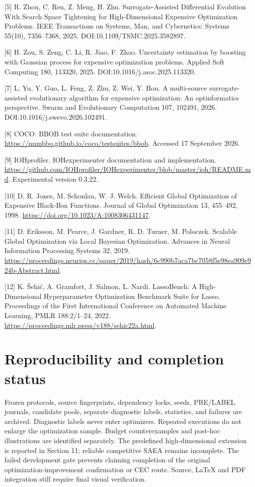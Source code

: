 \documentclass[11pt,a4paper]{article}
\begin{document}
{[}5{]} R. Zhou, C. Ren, Z. Meng, H. Zhu. Surrogate-Assisted
Differential Evolution With Search Space Tightening for High-Dimensional
Expensive Optimization Problems. IEEE Transactions on Systems, Man, and
Cybernetics: Systems 55(10), 7356--7368, 2025.
DOI:10.1109/TSMC.2025.3582897.

{[}6{]} H. Zou, S. Zeng, C. Li, R. Jiao, F. Zhao. Uncertainty estimation
by boosting with Gaussian process for expensive optimization problems.
Applied Soft Computing 180, 113320, 2025.
DOI:10.1016/j.asoc.2025.113320.

{[}7{]} L. Yu, Y. Guo, L. Feng, Z. Zhu, Z. Wei, Y. Hou. A multi-source
surrogate-assisted evolutionary algorithm for expensive optimization: An
optinformatics perspective. Swarm and Evolutionary Computation 107,
102491, 2026. DOI:10.1016/j.swevo.2026.102491.

{[}8{]} COCO. BBOB test suite documentation.
\url{https://numbbo.github.io/coco/testsuites/bbob}. Accessed 17
September 2026.

{[}9{]} IOHprofiler. IOHexperimenter documentation and implementation.
\url{https://github.com/IOHprofiler/IOHexperimenter/blob/master/ioh/README.md}.
Experimental version 0.3.22.

{[}10{]} D. R. Jones, M. Schonlau, W. J. Welch. Efficient Global
Optimization of Expensive Black-Box Functions. Journal of Global
Optimization 13, 455--492, 1998.
\url{https://doi.org/10.1023/A:1008306431147}.

{[}11{]} D. Eriksson, M. Pearce, J. Gardner, R. D. Turner, M. Poloczek.
Scalable Global Optimization via Local Bayesian Optimization. Advances
in Neural Information Processing Systems 32, 2019.
\url{https://proceedings.neurips.cc/paper/2019/hash/6c990b7aca7bc7058f5e98ea909e924b-Abstract.html}.

{[}12{]} K. Šehić, A. Gramfort, J. Salmon, L. Nardi. LassoBench: A
High-Dimensional Hyperparameter Optimization Benchmark Suite for Lasso.
Proceedings of the First International Conference on Automated Machine
Learning, PMLR 188:2/1--24, 2022.
\url{https://proceedings.mlr.press/v188/sehic22a.html}.

\hypertarget{reproducibility-and-completion-status}{%
\section{Reproducibility and completion
status}\label{reproducibility-and-completion-status}}

Frozen protocols, source fingerprints, dependency locks, seeds,
PRE/LABEL journals, candidate pools, separate diagnostic labels,
statistics, and failures are archived. Diagnostic labels never enter
optimizers. Repeated executions do not enlarge the optimization sample.
Budget counterexamples and post-hoc illustrations are identified
separately. The predefined high-dimensional extension is reported in
Section 11; reliable competitive SAEA remains incomplete. The failed
development gate prevents claiming completion of the original
optimization-improvement confirmation or CEC route. Source, LaTeX and
PDF integration still require final visual verification.
\end{document}
